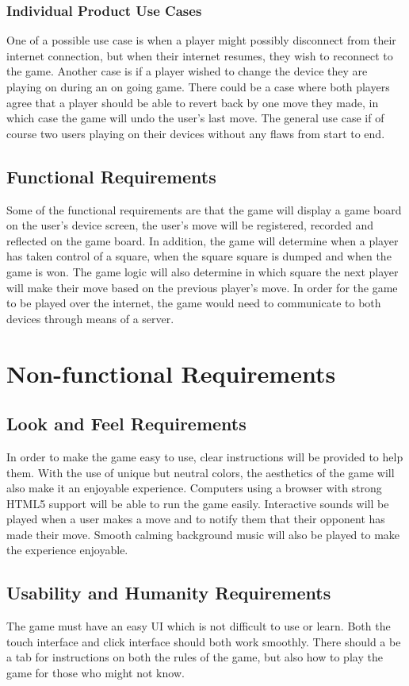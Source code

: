 \documentclass[12pt, titlepage]{article}
\begin{document}
\subsubsection{Individual Product Use Cases}
One of a possible use case is when a player might possibly disconnect from their internet connection, but when their internet resumes, they wish to reconnect to the game. Another case is if a player wished to change the device they are playing on during an on going game. There could be a case where both players agree that a player should be able to revert back by one move they made, in which case the game will undo the user’s last move. The general use case if of course two users playing on their devices without any flaws from start to end.
\subsection{Functional Requirements}
Some of the functional requirements are that the game will display a game board on the user’s device screen, the user’s move will be registered, recorded and reflected on the game board. In addition, the game will determine when a player has taken control of a square, when the square square is dumped and when the game is won. The game logic will also determine in which square the next player will make their move based on the previous player’s move. In order for the game to be played over the internet, the game would need to communicate to both devices through means of a server. 
\section{Non-functional Requirements}

\subsection{Look and Feel Requirements}
In order to make the game easy to use, clear instructions will be provided to help them. With the use of unique but neutral colors, the aesthetics of the game will also make it an enjoyable experience. Computers using a browser with strong HTML5 support will be able to run the game easily. Interactive sounds will be played when a user makes a move and to notify them that their opponent has made their move. Smooth calming background music will also be played to make the experience enjoyable.
\subsection{Usability and Humanity Requirements}
The game must have an easy UI which is not difficult to use or learn. Both the touch interface and click interface should both work smoothly. There should a be a tab for instructions on both the rules of the game, but also how to play the game for those who might not know.
\end{document}
